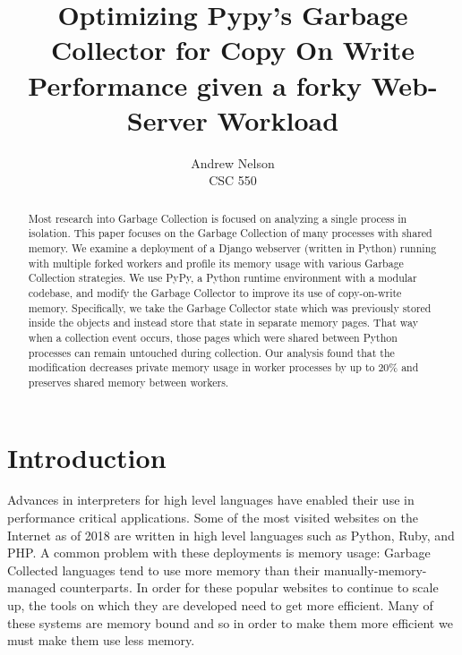 \documentclass{article}
\begin{document}
\begin{sloppypar}

\begin{titlepage}
    \title{Optimizing Pypy's Garbage Collector for Copy On Write Performance given a forky Web-Server Workload}
    \author{Andrew Nelson\\CSC 550}

    \maketitle

    \begin{abstract}
        Most research into Garbage Collection is focused on analyzing a single process in isolation.  This paper focuses on the Garbage Collection of many processes with shared memory.  We examine a deployment of a Django webserver (written in Python) running with multiple forked workers and profile its memory usage with various Garbage Collection strategies.  We use PyPy, a Python runtime environment with a modular codebase, and modify the Garbage Collector to improve its use of copy-on-write memory. Specifically, we take the Garbage Collector state which was previously stored inside the objects and instead store that state in separate memory pages.  That way when a collection event occurs, those pages which were shared between Python processes can remain untouched during collection.  Our analysis found that the modification decreases private memory usage in worker processes by up to 20\% and preserves shared memory between workers.  
    \end{abstract}
\end{titlepage}

\newpage

\tableofcontents

\newpage
{}
\twocolumn


\section{Introduction}
Advances in interpreters for high level languages have enabled their use in performance critical applications.  Some of the most visited websites on the Internet as of 2018 are written in high level languages such as Python, Ruby, and PHP.  A common problem with these deployments is memory usage: Garbage Collected languages tend to use more memory than their manually-memory-managed counterparts. In order for these popular websites to continue to scale up, the tools on which they are developed need to get more efficient.  Many of these systems are memory bound and so in order to make them more efficient we must make them use less memory.  


\end{sloppypar}
\end{document}
